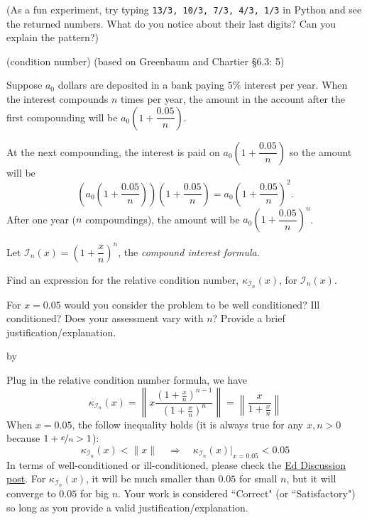 \documentclass[12pt,letterpaper,answers]{exam}
\makeatletter
\def\SetTotalwidth{\advance\linewidth by \@totalleftmargin
\@totalleftmargin=0pt}
\makeatother
\begin{document}
\begin{questions}
\begin{parts}
\begin{solution}
(As a fun experiment, try typing \texttt{13/3, 10/3, 7/3, 4/3, 1/3} in Python and see the returned numbers. What do you notice about their last digits? Can you explain the pattern?)

\end{solution}

\end{parts}

\question (condition number) (based on Greenbaum and Chartier \S6.3: 5)

Suppose $a_0$ dollars are deposited in a bank paying $5\%$ interest per year.  When the interest compounds $n$ times per year, the amount in the account after the first compounding will be $a_0\left(1+\dfrac{0.05}{n}\right)$.

At the next compounding, the interest is paid on $a_0\left(1+\dfrac{0.05}{n}\right)$ so the amount will be \[\left(a_0\left(1+\dfrac{0.05}{n}\right)\right)\left(1+\dfrac{0.05}{n}\right) = a_0\left(1+\dfrac{0.05}{n}\right)^2.\]  After one year ($n$ compoundings), the amount will be $a_0\left(1+\dfrac{0.05}{n}\right)^n$.

Let $\mathcal{I}_n(x) = \left(1+\dfrac{x}{n}\right)^n$, the \emph{compound interest formula}.
\begin{parts}
\item Find an expression for the relative condition number, $\kappa_{\mathcal{I}_n}(x)$, for $\mathcal{I}_n(x)$.

For $x = 0.05$ would you consider the problem to be well conditioned?  Ill conditioned?  Does your assessment vary with $n$?  Provide a brief justification/explanation.

\SetTotalwidth
\begin{solution}
Plug in the relative condition number formula, we have
$$\kappa_{\mathcal{I}_n}(x) = \left\lVert x \frac{(1+\frac{x}{n})^{n-1}}{(1+\frac{x}{n})^n} \right\rVert = \left\lVert \frac{x}{1+\frac{x}{n}} \right\rVert$$
When $x=0.05$, the follow inequality holds (it is always true for any $x, n>0$ because $1+\nicefrac{x}{n}>1$):
$$\kappa_{\mathcal{I}_n}(x)<\lVert x \rVert \quad\Longrightarrow\quad \kappa_{\mathcal{I}_n}(x)\bigg|_{x=0.05}<0.05$$
In terms of well-conditioned or ill-conditioned, please check the \href{https://edstem.org/us/courses/24695/discussion/1746969?answer=3974365}{Ed Discussion post}. For $\kappa_{\mathcal{I}_n}(x)$, it will be much smaller than $0.05$ for small $n$, but it will converge to $0.05$ for big $n$. Your work is considered ``Correct" (or ``Satisfactory") so long as you provide a valid justification/explanation.
\end{solution}


\end{parts}
\end{questions}
\end{document}
